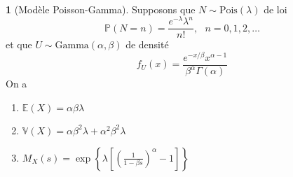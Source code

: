 \documentclass[8pt,notheorems]{beamer}
\def \E{\mathbb E}
\def \P {\mathbb P}
\def \V{\mathbb V}
\theoremstyle{definition}
\theoremstyle{example}
\newtheorem{example}{\translate{Example}}
\theoremstyle{mystyle}
\theoremstyle{plain}
\begin{document}
\begin{frame}[allowframebreaks]
\begin{enumerate}
\begin{eqnarray*}
    \end{eqnarray*}
\end{enumerate}
\begin{example}[Modèle Poisson-Gamma]
Supposons que $N\sim \text{Pois}(\lambda)$ de loi
$$
\P(N =n)=\frac{e^{-\lambda}\lambda^n}{n!},\text{ }n = 0,1,2,\ldots
$$
et que $U\sim \text{Gamma}(\alpha, \beta)$ de densité
$$
f_U(x) = \frac{e^{-x/\beta}x^{\alpha-1}}{\beta^\alpha\Gamma(\alpha)}
$$
On a
\begin{enumerate}
    \item $\E(X) = \alpha\beta\lambda$
    \item $\V(X) = \alpha\beta^2\lambda + \alpha^2\beta^2\lambda$
    \item $M_X(s) = \exp\left\{\lambda\left[\left(\frac{1}{1-\beta s}\right)^\alpha - 1\right]\right\}$
\end{enumerate}
\end{example}
\end{frame}
\end{document}
